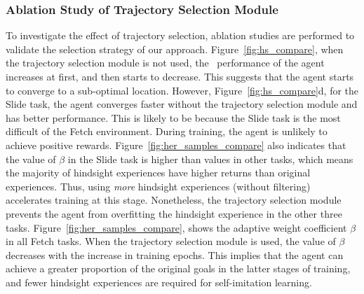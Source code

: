 \subsubsection{Ablation Study of Trajectory Selection Module}
To investigate the effect of trajectory selection, {ablation studies are performed} to validate the selection strategy of our approach. {Figure~\ref{fig:hs_compare}}, when the trajectory selection module is not used, the~ performance of the agent increases at first, and then starts to decrease. This suggests that the agent starts to converge to a sub-optimal location. However, {Figure~\ref{fig:hs_compare}d}, for the Slide task, the agent converges faster without the trajectory selection module and has better performance. {This is likely to be because the Slide task is the most difficult of the Fetch environment. During training, the agent is unlikely to achieve positive rewards. Figure~\ref{fig:her_samples_compare} also indicates that the value of $\beta$ in the Slide task is higher than values in other tasks, which means the majority of hindsight experiences have higher returns than original experiences. Thus, using {\em more} hindsight experiences (without filtering) accelerates training at this stage.} Nonetheless, the trajectory selection module prevents the agent from overfitting the hindsight experience in the other three tasks. Figure~\ref{fig:her_samples_compare}, shows the adaptive weight coefficient $\beta$ in all Fetch tasks. When the trajectory selection module is used, the value of $\beta$ decreases with the increase in training epochs. This implies that the agent can achieve a greater proportion of the original goals in the latter stages of training, and fewer hindsight experiences are required for self-imitation learning.
